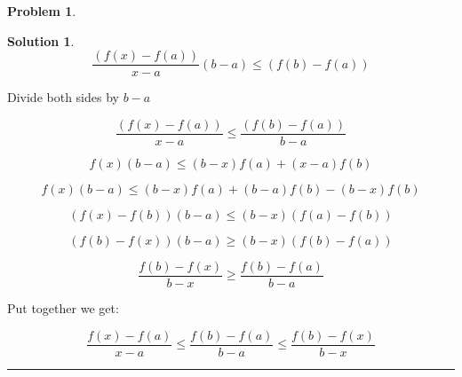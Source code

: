 \documentclass{article}
\theoremstyle{definition}
\newtheorem{problem}{Problem}
\def\fline{\rule{0.75\linewidth}{0.5pt}}
\newcommand{\finishline}{\begin{center}\fline\end{center}}
\newtheorem*{solution*}{Solution}
\newenvironment{solution}{\begin{solution*}}{{\finishline} \end{solution*}}
\begin{document}
\begin{problem}
\begin{enumerate}
\begin{solution}
                    \begin{equation}
                        \label{eq:example}
                            \frac{(f(x) - f(a))}{x - a} (b - a) \leq (f(b) - f(a))
                    \end{equation}

                    Divide both sides by $b - a$

                    \begin{equation}
                        \label{eq:example}
                            \frac{(f(x) - f(a))}{x - a}  \leq \frac{(f(b) - f(a))}{b - a}
                    \end{equation}


                    \begin{equation}
                        \label{eq:example}
                            f(x) (b - a) \leq (b - x) f(a) + (x - a) f(b)
                    \end{equation}

                    \begin{equation}
                        \label{eq:example}
                            f(x) (b - a) \leq (b - x) f(a) + (b - a) f(b) - (b - x) f(b)
                    \end{equation}

                    \begin{equation}
                        \label{eq:example}
                            (f(x) - f(b)) (b - a) \leq (b - x) (f(a) - f(b))
                    \end{equation}

                    \begin{equation}
                        \label{eq:example}
                            (f(b) - f(x)) (b - a) \geq (b - x) (f(b) - f(a))
                    \end{equation}

                    \begin{equation}
                        \label{eq:example}
                            \frac{f(b) - f(x)}{b - x} \geq \frac{f(b) - f(a)}{b - a}
                    \end{equation}

Put together we get: \newline 

\begin{equation}
                        \label{eq:example}
                            \frac{f(x) - f(a)}{x - a}  \leq \frac{f(b) - f(a)}{b - a} \leq \frac{f(b) - f(x)}{b - x} 
                    \end{equation}
                    

\end{solution}
\end{enumerate}
\end{problem}
\end{document}
